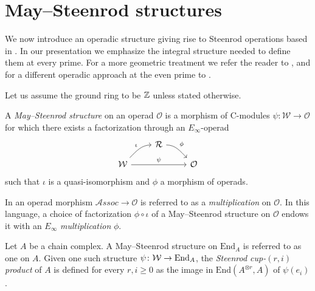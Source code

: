 
\section{May--Steenrod structures} \label{s:steenrod}

We now introduce an operadic structure giving rise to Steenrod operations based in \cite{may1970general}.
In our presentation we emphasize the integral structure needed to define them at every prime.
For a more geometric treatment we refer the reader to \cite{may1972geometry, may76homology, lawson2020dyerlashof}, and for a different operadic approach at the even prime to \cite{chataur2005adem-cartan}.

Let us assume the ground ring to be $\mathbb{Z}$ unless stated otherwise.
\begin{definition} \label{def: May--Steenrod structure}
	A \textit{May--Steenrod structure} on an operad $\mathcal O$ is a
	morphism of $\mathrm{C}$-modules $\psi \colon \mathcal W \to \mathcal O$ for which there exists a factorization through an $E_\infty$-operad
	\begin{equation*}
	\begin{tikzcd}[column sep = normal, row sep = small]
	& \mathcal R \arrow[dr, "\phi", out=0] & \\
	\mathcal W \arrow[ur, "\iota", in=180] \arrow[rr, "\psi"] & & \mathcal O
	\end{tikzcd}
	\end{equation*}
	such that $\iota$ is a quasi-isomorphism and $\phi$ a morphism of operads.
\end{definition}

\begin{remark} \label{rmk: Deligne conjecture}
	In \cite{GerstenhaberVoronov} an operad morphism $\mathcal{A}ssoc \to \mathcal O$ is referred to as a \textit{multiplication} on $\mathcal O$.
	In this language, a choice of factorization $\phi \circ \iota$ of a May--Steenrod structure on $\mathcal O$ endows it with an $E_\infty$ \textit{multiplication} $\phi$.
\end{remark}

\begin{definition} \label{def: Steenrod products}
	Let $A$ be a chain complex.
	A May--Steenrod structure on $\mathrm{End}_A$ is referred to as one on $A$.
	Given one such structure $\psi \colon \mathcal W \to \mathrm{End}_A$, the \textit{Steenrod cup-}$(r, i)$ \textit{product} of $A$ is defined for every $r, i \geq 0$ as the image in $ \mathrm{End}(A^{\otimes r}, A)$ of $\psi(e_i)$.
\end{definition}

